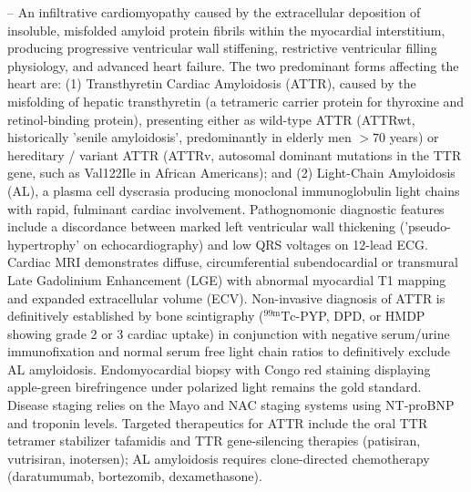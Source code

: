 -- An infiltrative cardiomyopathy caused by the extracellular deposition of insoluble, misfolded amyloid protein fibrils within the myocardial interstitium, producing progressive ventricular wall stiffening, restrictive ventricular filling physiology, and advanced heart failure. The two predominant forms affecting the heart are: (1) Transthyretin Cardiac Amyloidosis (ATTR), caused by the misfolding of hepatic transthyretin (a tetrameric carrier protein for thyroxine and retinol-binding protein), presenting either as wild-type ATTR (ATTRwt, historically 'senile amyloidosis', predominantly in elderly men $>70$ years) or hereditary / variant ATTR (ATTRv, autosomal dominant mutations in the TTR gene, such as Val122Ile in African Americans); and (2) Light-Chain Amyloidosis (AL), a plasma cell dyscrasia producing monoclonal immunoglobulin light chains with rapid, fulminant cardiac involvement. Pathognomonic diagnostic features include a discordance between marked left ventricular wall thickening ('pseudo-hypertrophy' on echocardiography) and low QRS voltages on 12-lead ECG. Cardiac MRI demonstrates diffuse, circumferential subendocardial or transmural Late Gadolinium Enhancement (LGE) with abnormal myocardial T1 mapping and expanded extracellular volume (ECV). Non-invasive diagnosis of ATTR is definitively established by bone scintigraphy ($^{99\text{m}}\text{Tc}$-PYP, DPD, or HMDP showing grade 2 or 3 cardiac uptake) in conjunction with negative serum/urine immunofixation and normal serum free light chain ratios to definitively exclude AL amyloidosis. Endomyocardial biopsy with Congo red staining displaying apple-green birefringence under polarized light remains the gold standard. Disease staging relies on the Mayo and NAC staging systems using NT-proBNP and troponin levels. Targeted therapeutics for ATTR include the oral TTR tetramer stabilizer tafamidis and TTR gene-silencing therapies (patisiran, vutrisiran, inotersen); AL amyloidosis requires clone-directed chemotherapy (daratumumab, bortezomib, dexamethasone).

